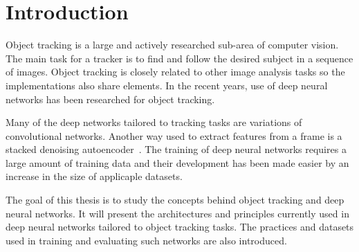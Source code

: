 \section{Introduction}

Object tracking is a large and actively researched sub-area of computer vision. The
main task for a tracker is to find and follow the desired subject in a sequence of
images. Object tracking is closely related to other image analysis tasks so the
implementations also share elements. In the recent years, use of deep neural networks
has been researched for object tracking.

Many of the deep networks tailored to tracking tasks are variations of convolutional
networks. Another way used to extract features from a frame is a stacked denoising
autoencoder~\cite{LEARNING_DEEP}. The training of deep neural networks requires a
large amount of training data and their development has been made easier by an increase
in the size of applicaple datasets.

The goal of this thesis is to study the concepts behind object tracking and deep neural
networks. It will present the architectures and principles currently used in deep
neural networks tailored to object tracking tasks. The practices and datasets used
in training and evaluating such networks are also introduced.
